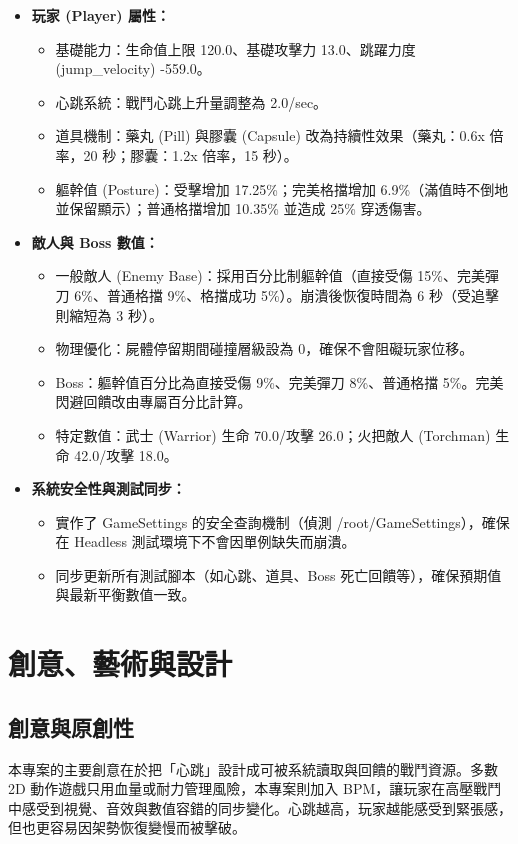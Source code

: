 \documentclass[12pt,a4paper]{article}
\begin{document}
\begin{itemize}[leftmargin=2em]
  \item \textbf{玩家 (Player) 屬性：}
    \begin{itemize}
      \item 基礎能力：生命值上限 120.0、基礎攻擊力 13.0、跳躍力度 (jump\_velocity) -559.0。
      \item 心跳系統：戰鬥心跳上升量調整為 2.0/sec。
      \item 道具機制：藥丸 (Pill) 與膠囊 (Capsule) 改為持續性效果（藥丸：0.6x 倍率，20 秒；膠囊：1.2x 倍率，15 秒）。
      \item 軀幹值 (Posture)：受擊增加 17.25\%；完美格擋增加 6.9\%（滿值時不倒地並保留顯示）；普通格擋增加 10.35\% 並造成 25\% 穿透傷害。
    \end{itemize}
  \item \textbf{敵人與 Boss 數值：}
    \begin{itemize}
      \item 一般敵人 (Enemy Base)：採用百分比制軀幹值（直接受傷 15\%、完美彈刀 6\%、普通格擋 9\%、格擋成功 5\%）。崩潰後恢復時間為 6 秒（受追擊則縮短為 3 秒）。
      \item 物理優化：屍體停留期間碰撞層級設為 0，確保不會阻礙玩家位移。
      \item Boss：軀幹值百分比為直接受傷 9\%、完美彈刀 8\%、普通格擋 5\%。完美閃避回饋改由專屬百分比計算。
      \item 特定數值：武士 (Warrior) 生命 70.0/攻擊 26.0；火把敵人 (Torchman) 生命 42.0/攻擊 18.0。
    \end{itemize}
  \item \textbf{系統安全性與測試同步：}
    \begin{itemize}
      \item 實作了 GameSettings 的安全查詢機制（偵測 /root/GameSettings），確保在 Headless 測試環境下不會因單例缺失而崩潰。
      \item 同步更新所有測試腳本（如心跳、道具、Boss 死亡回饋等），確保預期值與最新平衡數值一致。
    \end{itemize}
\end{itemize}

\section{創意、藝術與設計}

\subsection{創意與原創性}
本專案的主要創意在於把「心跳」設計成可被系統讀取與回饋的戰鬥資源。多數 2D 動作遊戲只用血量或耐力管理風險，本專案則加入 BPM，讓玩家在高壓戰鬥中感受到視覺、音效與數值容錯的同步變化。心跳越高，玩家越能感受到緊張感，但也更容易因架勢恢復變慢而被擊破。
\end{document}
